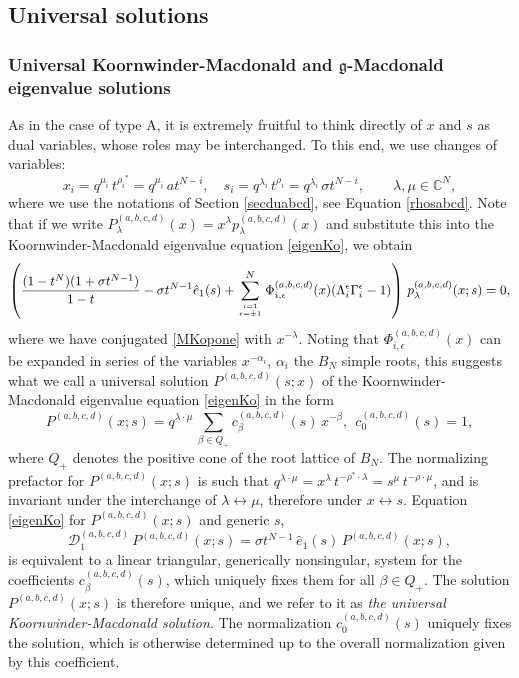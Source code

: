 \documentclass[12pt]{amsart}
\newcommand{\g}{{\mathfrak{g}}}
\newcommand{\C}{{\mathbb C}}
\newcommand{\al}{{\alpha}}
\newcommand{\lL}{{\Lambda}}
\numberwithin{equation}{section}
\begin{document}
\subsection{Universal solutions}\label{sec:51}


\subsubsection{Universal Koornwinder-Macdonald and $\g$-Macdonald eigenvalue solutions}
As in the case of type A, it is extremely fruitful to think directly of $x$ and $s$
as dual variables, whose roles may be interchanged. 
To this end, we use changes of variables:
%
$$
x_i=q^{\mu_i}\, t^{{\rho_i}^*}=q^{\mu_i}\, a t^{N-i}, \quad s_i=q^{\lambda_i}\, t^{\rho_i}=q^{\lambda_i}\, \sigma t^{N-i}, \qquad \lambda,\mu\in \C^N,
$$
%
where we use the notations of Section \ref{secduabcd}, see Equation \eqref{rhosabcd}.
%
%
%
%
Note that if we write $P_\lambda^{(a,b,c,d)}(x)=x^\lambda p_\lambda^{(a,b,c,d)}(x)$ and substitute this into the 
Koornwinder-Macdonald eigenvalue equation \eqref{eigenKo}, we obtain
$$\left(\frac{(1-t^N)(1+\sigma t^{N-1})}{1-t}-\sigma t^{N-1} \hat e_1(s)+\sum_{i=1\atop\epsilon=\pm 1}^N \Phi_{i,\epsilon}^{(a,b,c,d)}(x)(\lL_i^\epsilon \Gamma_i^\epsilon-1) \right) \, p_\lambda^{(a,b,c,d)}(x;s)=0,$$
where we have conjugated \eqref{MKopone} with $x^{-\lambda}$. Noting that $\Phi_{i,\epsilon}^{(a,b,c,d)}(x)$ can be expanded in series 
of the variables $x^{-\al_i}$, $\al_i$ the $B_N$ simple roots, this suggests what we call a universal solution $P^{(a,b,c,d)}(s;x)$ of the 
Koornwinder-Macdonald eigenvalue equation \eqref{eigenKo}
in the form 
\begin{equation}\label{sumK}
P^{(a,b,c,d)}(x;s)=q^{\lambda\cdot\mu}\,\sum_{\beta\in Q_+} c_\beta^{(a,b,c,d)}(s)\, x^{-\beta},\ \ 
c_0^{(a,b,c,d)}(s)=1,\end{equation}
where $Q_+$ denotes the positive cone of the root lattice of $B_N$.
%
The  normalizing prefactor for $P^{(a,b,c,d)}(x;s)$ is such that 
$q^{\lambda\cdot\mu}=x^\lambda \, t^{-\rho^*\cdot\lambda} =s^\mu \, t^{-\rho\cdot\mu}$,
and is invariant under the interchange of $\lambda\leftrightarrow \mu$, therefore under $x\leftrightarrow s$.
%
%
%
%
%
%
%
%
%
%
%
%
Equation \eqref{eigenKo} for $P^{(a,b,c,d)}(x;s)$ and generic $s$,
\begin{equation}\label{genericeigen}
{\mathcal D}_1^{(a,b,c,d)}\,P^{(a,b,c,d)}(x;s)=\sigma t^{N-1}\,\hat e_1(s)\,P^{(a,b,c,d)}(x;s),
\end{equation}
is equivalent to a linear triangular, generically nonsingular, system for the
coefficients $c_\beta^{(a,b,c,d)}(s)$, which uniquely fixes them for all $\beta\in Q_+$. The solution $P^{(a,b,c,d)}(x;s)$ is therefore unique,
and we refer to it as {\it the universal Koornwinder-Macdonald solution}.
%
%
%
The normalization ${c}_0^{(a,b,c,d)}(s)$ uniquely fixes the solution, which is otherwise determined up to the overall normalization given by this coefficient.
%
\end{document}
